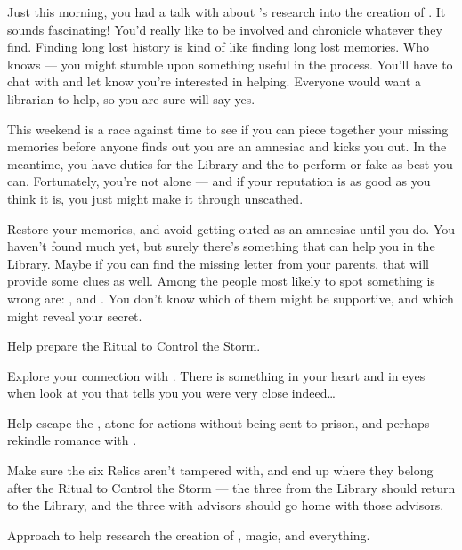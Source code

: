 \documentclass[char]{GL2020}
\begin{document}
Just this morning, you had a talk with \cBeetle{\full} about \cEbbPriest{\full}'s research into the creation of \pEarth{}. It sounds fascinating! You'd really like to be involved and chronicle whatever they find. Finding long lost history is kind of like finding long lost memories. Who knows — you might stumble upon something useful in the process. You'll have to chat with \cEbbPriest{} and let \cEbbPriest{\them} know you're interested in helping. Everyone would want a librarian to help, so you are sure \cEbbPriest{} will say yes.

This weekend is a race against time to see if you can piece together your missing memories before anyone finds out you are an amnesiac and kicks you out. In the meantime, you have duties for the Library and the \pSc{} to perform or fake as best you can. Fortunately, you're not alone — and if your reputation is as good as you think it is, you just might make it through unscathed.

\begin{itemz}
    \item Restore your memories, and avoid getting outed as an amnesiac until you do. You haven't found much yet, but surely there's something that can help you in the Library. Maybe if you can find the missing letter from your parents, that will provide some clues as well. Among the people most likely to spot something is wrong are: \cLibAssist{} \cPresident{}, \cAmbition{} and \cWildCard{}. You don’t know which of them might be supportive, and which might reveal your secret.
    \item Help prepare the Ritual to Control the Storm.
    \item Explore your connection with \cInterpol{}. There is something in your heart and in \cInterpol{\their} eyes when \cInterpol{\they} look\cInterpol{\verbs} at you that tells you you were very close indeed\ldots{}
    \item Help \cChupAvenger{} escape the \pGoaties{}, atone for \cChupAvenger{\their} actions without being sent to prison, and perhaps rekindle \cChupAvenger{\their} romance with \cHeadScientist{}.

\end{itemz}

\begin{itemz}
    \item Make sure the six Relics aren't tampered with, and end up where they belong after the Ritual to Control the Storm — the three from the Library should return to the Library, and the three with advisors should go home with those advisors.
    \item Approach \cEbbPriest{} to help research the creation of \pEarth{}, magic, and everything.
\end{itemz}
\end{document}
